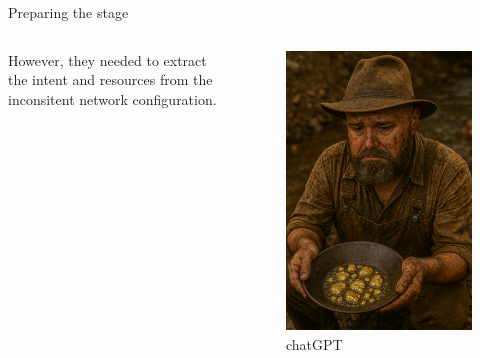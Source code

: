 \documentclass[aspectratio=169]{beamer}
\begin{document}
\begin{frame}{Preparing the stage}

  \begin{columns}
    \begin{column}{0.4\textwidth}
      However, they needed to extract the intent and resources from the inconsitent network configuration.
    \end{column}
    \begin{column}{0.4\textwidth}
      \begin{figure}
        \includegraphics[height = 0.7\textheight]{images/urs_gold_rush_glory.png}
        \caption{\footnotesize chatGPT}
      \end{figure}
    \end{column}
  \end{columns}

\end{frame}
\end{document}
